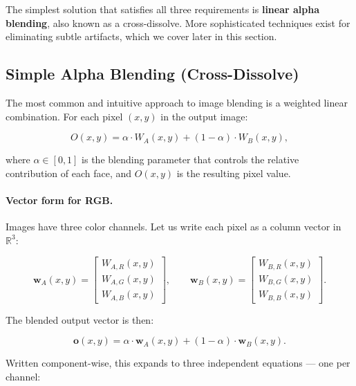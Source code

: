 The simplest solution that satisfies all three requirements is \textbf{linear alpha blending},
also known as a cross-dissolve. More sophisticated techniques exist for eliminating subtle
artifacts, which we cover later in this section.

\subsection{Simple Alpha Blending (Cross-Dissolve)}

The most common and intuitive approach to image blending is a weighted linear combination.
For each pixel $(x, y)$ in the output image:

\begin{equation}
    \label{eq:alpha-blend-scalar}
    O(x, y) = \alpha \cdot W_A(x, y) + (1 - \alpha) \cdot W_B(x, y),
\end{equation}

where $\alpha \in [0, 1]$ is the blending parameter that controls the relative contribution of
each face, and $O(x, y)$ is the resulting pixel value.

\paragraph{Vector form for RGB.} Images have three color channels. Let us write each pixel as
a column vector in $\mathbb{R}^3$:

\begin{equation}
    \mathbf{w}_A(x, y) = \begin{bmatrix}
        W_{A,R}(x, y) \\
        W_{A,G}(x, y) \\
        W_{A,B}(x, y)
    \end{bmatrix},
    \qquad
    \mathbf{w}_B(x, y) = \begin{bmatrix}
        W_{B,R}(x, y) \\
        W_{B,G}(x, y) \\
        W_{B,B}(x, y)
    \end{bmatrix}.
\end{equation}

The blended output vector is then:

\begin{equation}
    \label{eq:alpha-blend-vector}
    \mathbf{o}(x, y) = \alpha \cdot \mathbf{w}_A(x, y) + (1 - \alpha) \cdot \mathbf{w}_B(x, y).
\end{equation}

Written component-wise, this expands to three independent equations --- one per channel:

